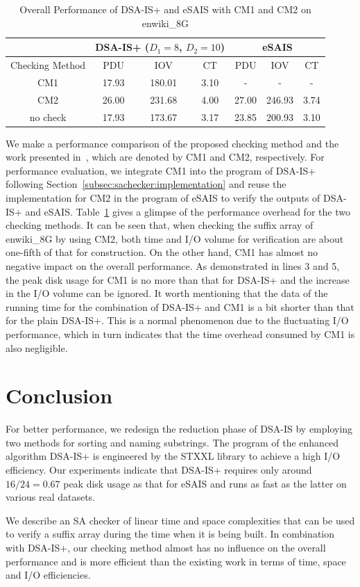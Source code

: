\documentclass[10pt,journal,compsoc]{IEEEtran}
\begin{document}
\begin{table}[htbp]
	\caption{Overall Performance of DSA-IS+ and eSAIS with CM1 and CM2 on enwiki\_8G}
	\label{tbl:check_overhead}
	\centering
	\begin{tabular}{|c|c|c|c|c|c|c|}
		\hline
		& \multicolumn{3}{|c|}{DSA-IS+ ($D_1 = 8$, $D_2 = 10$)} & \multicolumn{3}{c|}{eSAIS}\\\hline
		Checking Method & PDU & IOV & CT & PDU & IOV & CT \\\hline
		CM1 & 17.93  & 180.01 & 3.10 & - & - & - \\\hline
		CM2 & 26.00 & 231.68 & 4.00 & 27.00 & 246.93 & 3.74 \\\hline
		no check & 17.93  & 173.67	& 3.17 & 23.85 & 200.93 & 3.10 \\\hline
	\end{tabular}
\end{table}%


We make a performance comparison of the proposed checking method and the work presented in~\cite{Karkkainen2003}, which are denoted by CM1 and CM2, respectively. For performance evaluation, we integrate CM1 into the program of DSA-IS+ following Section~\ref{subsec:sachecker:implementation} and reuse the implementation for CM2 in the program of eSAIS to verify the outputs of DSA-IS+ and eSAIS. Table~\ref{tbl:check_overhead} gives a glimpse of the performance overhead for the two checking methods. It can be seen that, when checking the suffix array of enwiki\_8G by using CM2, both time and I/O volume for verification are about one-fifth of that for construction. On the other hand, CM1 has almost no negative impact on the overall performance. As demonstrated in lines 3 and 5, the peak disk usage for CM1 is no more than that for DSA-IS+ and the increase in the I/O volume can be ignored. It worth mentioning that the data of the running time for the combination of DSA-IS+ and CM1 is a bit shorter than that for the plain DSA-IS+. This is a normal phenomenon due to the fluctuating I/O performance, which in turn indicates that the time overhead consumed by CM1 is also negligible.

\section{Conclusion} \label{sec:conclusion}

For better performance, we redesign the reduction phase of DSA-IS by employing two methods for sorting and naming substrings. The program of the enhanced algorithm DSA-IS+ is engineered by the STXXL library to achieve a high I/O efficiency. Our experiments indicate that DSA-IS+ requires only around $16/24=0.67$ peak disk usage as that for eSAIS and runs as fast as the latter on various real datasets.

We describe an SA checker of linear time and space complexities that can be used to verify a suffix array during the time when it is being built. In combination with DSA-IS+, our checking method almost has no influence on the overall performance and is more efficient than the existing work in terms of time, space and I/O efficiencies.



\end{document}
